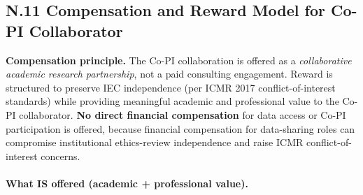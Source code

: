 \subsection*{N.11 Compensation and Reward Model for Co-PI Collaborator}
\label{sec:appendix_n_compensation_reward}

\noindent\textbf{Compensation principle.} The Co-PI collaboration is offered as a \emph{collaborative academic research partnership}, not a paid consulting engagement. Reward is structured to preserve IEC independence (per ICMR 2017 conflict-of-interest standards) while providing meaningful academic and professional value to the Co-PI collaborator. \textbf{No direct financial compensation} for data access or Co-PI participation is offered, because financial compensation for data-sharing roles can compromise institutional ethics-review independence and raise ICMR conflict-of-interest concerns.

\paragraph{What IS offered (academic + professional value).}

